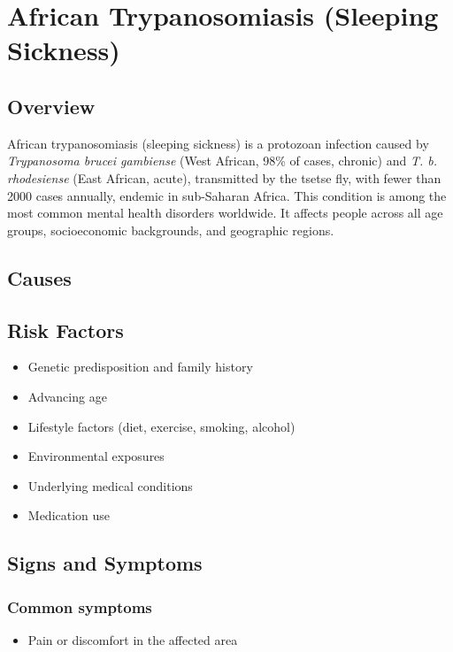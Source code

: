 \chapter{African Trypanosomiasis (Sleeping Sickness)}
\label{sec:African Trypanosomiasis}

\section{Overview}
African trypanosomiasis (sleeping sickness) is a protozoan infection caused by \textit{Trypanosoma brucei gambiense} (West African, 98\% of cases, chronic) and \textit{T. b. rhodesiense} (East African, acute), transmitted by the tsetse fly, with fewer than 2000 cases annually, endemic in sub-Saharan Africa. This condition is among the most common mental health disorders worldwide. It affects people across all age groups, socioeconomic backgrounds, and geographic regions.
\section{Causes}
\section{Risk Factors}

\begin{itemize}[noitemsep]
  \item Genetic predisposition and family history
  \item Advancing age
  \item Lifestyle factors (diet, exercise, smoking, alcohol)
  \item Environmental exposures
  \item Underlying medical conditions
  \item Medication use
\end{itemize}
\section{Signs and Symptoms}

\subsection{Common symptoms}
\begin{itemize}[noitemsep]
  \item Pain or discomfort in the affected area
  \end{itemize}

